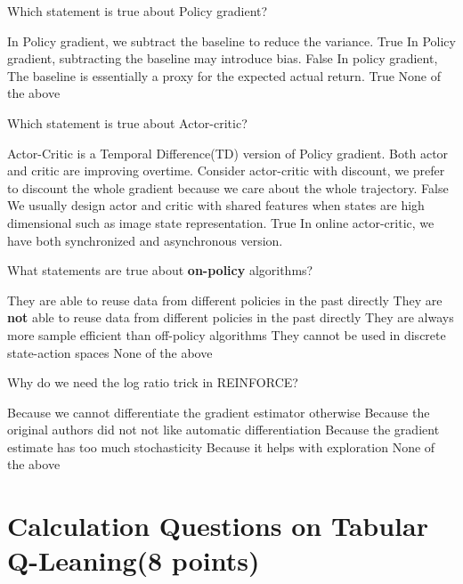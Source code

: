 \documentclass[letterpaper,12pt,addpoints]{exam}
\begin{document}
\begin{questions}
\question[2] Which statement is true about Policy gradient?
\begin{checkboxes}
\choice In Policy gradient, we subtract the baseline to reduce the variance. True
\choice In Policy gradient, subtracting the baseline may introduce bias. False
\choice In policy gradient, The baseline is essentially a proxy for the expected actual return. True
\choice None of the above
\end{checkboxes}

\question[2] Which statement is true about Actor-critic?
\begin{checkboxes}
 \choice Actor-Critic is a Temporal Difference(TD) version of Policy gradient.
 \choice Both actor and critic are improving overtime.
 \choice Consider actor-critic with discount, we prefer to discount the whole gradient because we care about the whole trajectory. False
 \choice We usually design actor and critic with shared features when states are high dimensional such as image state representation. True
 \choice In online actor-critic, we have both synchronized and asynchronous version.
\end{checkboxes}


\question[2] What statements are true about \textbf{on-policy} algorithms?
\begin{checkboxes}
 \choice They are able to reuse data from different policies in the past directly
 \choice They are \textbf{not} able to reuse data from different policies in the past directly
 \choice They are always more sample efficient than off-policy algorithms
 \choice They cannot be used in discrete state-action spaces
 \choice None of the above
\end{checkboxes}
\question[2] Why do we need the log ratio trick in REINFORCE?
\begin{checkboxes}
\choice Because we cannot differentiate the gradient estimator otherwise
\choice Because the original authors did not not like automatic differentiation
\choice Because the gradient estimate has too much stochasticity
\choice Because it helps with exploration 
\choice None of the above
\end{checkboxes}
\end{questions}

\clearpage


\section{Calculation Questions on Tabular Q-Leaning(8 points)}
\end{document}
